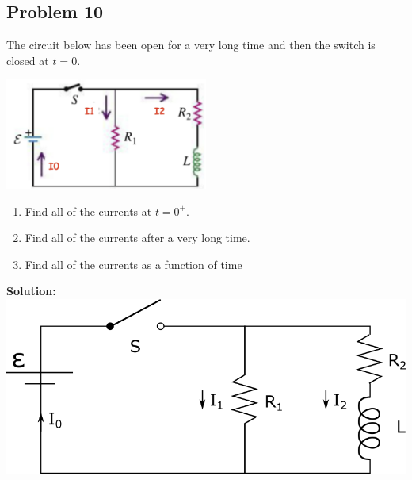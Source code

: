 \subsection*{Problem 10}
The circuit below has been open for a very long time and then the switch is closed at $t=0$.\\
\centerline{\includegraphics[width=0.5\textwidth]{Images/P10img1.png}}
\begin{enumerate}
    \item Find all of the currents at $t=0^+$.
    \item Find all of the currents after a very long time.
    \item Find all of the currents as a function of time
\end{enumerate}

\textbf{Solution:}\\
\includegraphics[width=0.5\linewidth]{Images/P10img2.png}
\vspace{5mm}

